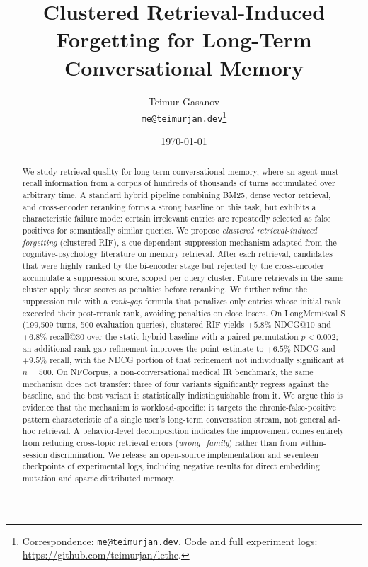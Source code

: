 \documentclass[11pt,a4paper]{article}
\title{Clustered Retrieval-Induced Forgetting for Long-Term\\Conversational Memory}
\author{%
  Teimur Gasanov\\
  \texttt{me@teimurjan.dev}\footnote{Correspondence: \texttt{me@teimurjan.dev}. Code and full experiment logs: \url{https://github.com/teimurjan/lethe}.}
}
\date{\today}
\begin{document}
\maketitle

\begin{abstract}
We study retrieval quality for long-term conversational memory, where an agent must recall information from a corpus of hundreds of thousands of turns accumulated over arbitrary time. A standard hybrid pipeline combining BM25, dense vector retrieval, and cross-encoder reranking forms a strong baseline on this task, but exhibits a characteristic failure mode: certain irrelevant entries are repeatedly selected as false positives for semantically similar queries. We propose \emph{clustered retrieval-induced forgetting} (clustered RIF), a cue-dependent suppression mechanism adapted from the cognitive-psychology literature on memory retrieval. After each retrieval, candidates that were highly ranked by the bi-encoder stage but rejected by the cross-encoder accumulate a suppression score, scoped per query cluster. Future retrievals in the same cluster apply these scores as penalties before reranking. We further refine the suppression rule with a \emph{rank-gap} formula that penalizes only entries whose initial rank exceeded their post-rerank rank, avoiding penalties on close losers. On LongMemEval S (199{,}509 turns, 500 evaluation queries), clustered RIF yields $+5.8\%$ NDCG@10 and $+6.8\%$ recall@30 over the static hybrid baseline with a paired permutation $p < 0.002$; an additional rank-gap refinement improves the point estimate to $+6.5\%$ NDCG and $+9.5\%$ recall, with the NDCG portion of that refinement not individually significant at $n=500$. On NFCorpus, a non-conversational medical IR benchmark, the same mechanism does not transfer: three of four variants significantly regress against the baseline, and the best variant is statistically indistinguishable from it. We argue this is evidence that the mechanism is workload-specific: it targets the chronic-false-positive pattern characteristic of a single user's long-term conversation stream, not general ad-hoc retrieval. A behavior-level decomposition indicates the improvement comes entirely from reducing cross-topic retrieval errors (\emph{wrong\_family}) rather than from within-session discrimination. We release an open-source implementation and seventeen checkpoints of experimental logs, including negative results for direct embedding mutation and sparse distributed memory.
\end{abstract}
\end{document}
